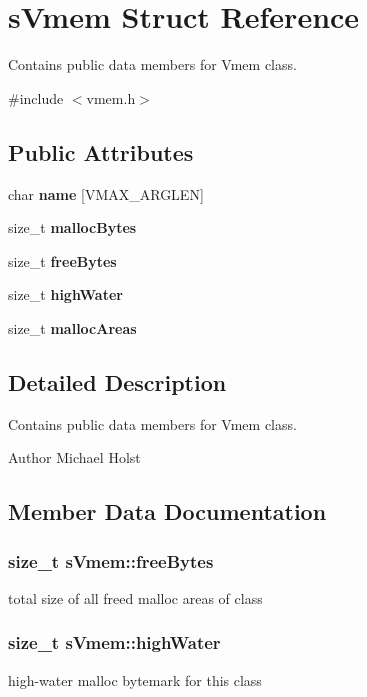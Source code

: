 \section{sVmem Struct Reference}
\label{a00003}


Contains public data members for Vmem class.  




{\ttfamily \#include $<$vmem.h$>$}

\subsection*{Public Attributes}
\begin{DoxyCompactItemize}
\item 
char {\bf name} [VMAX\_\-ARGLEN]
\item 
size\_\-t {\bf mallocBytes}
\item 
size\_\-t {\bf freeBytes}
\item 
size\_\-t {\bf highWater}
\item 
size\_\-t {\bf mallocAreas}
\end{DoxyCompactItemize}


\subsection{Detailed Description}
Contains public data members for Vmem class. \begin{DoxyAuthor}{Author}
Michael Holst 
\end{DoxyAuthor}


\subsection{Member Data Documentation}
\subsubsection[{freeBytes}]{\setlength{\rightskip}{0pt plus 5cm}size\_\-t {\bf sVmem::freeBytes}}\label{a00003_ab27fc8fe9d21afcea1873ad370fd908b}
total size of all freed malloc areas of class 
\subsubsection[{highWater}]{\setlength{\rightskip}{0pt plus 5cm}size\_\-t {\bf sVmem::highWater}}\label{a00003_af47cf8b9bda257c19cf2866e14be131d}
high-\/water malloc bytemark for this class 
